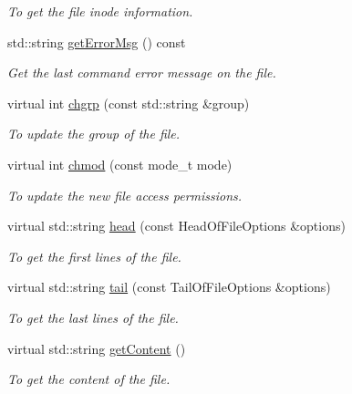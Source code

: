 \begin{DoxyCompactItemize}
\begin{DoxyCompactList}\small\item\em To get the file inode information. \item\end{DoxyCompactList}\item 
std::string \hyperlink{classSSHFile_abe6ff51f2bc2a0da5b504a311ede2648}{getErrorMsg} () const 
\begin{DoxyCompactList}\small\item\em Get the last command error message on the file. \item\end{DoxyCompactList}\item 
virtual int \hyperlink{classSSHFile_aa0b50bce63279fd0c1e14e7b9058b900}{chgrp} (const std::string \&group)
\begin{DoxyCompactList}\small\item\em To update the group of the file. \item\end{DoxyCompactList}\item 
virtual int \hyperlink{classSSHFile_a8a8a8991bac15f105f5bb144c63999b3}{chmod} (const mode\_\-t mode)
\begin{DoxyCompactList}\small\item\em To update the new file access permissions. \item\end{DoxyCompactList}\item 
virtual std::string \hyperlink{classSSHFile_a6dd61931bed51f7a61183ef73beb3d6f}{head} (const HeadOfFileOptions \&options)
\begin{DoxyCompactList}\small\item\em To get the first lines of the file. \item\end{DoxyCompactList}\item 
virtual std::string \hyperlink{classSSHFile_a29bb48719424956f73ddd3eee8dc8090}{tail} (const TailOfFileOptions \&options)
\begin{DoxyCompactList}\small\item\em To get the last lines of the file. \item\end{DoxyCompactList}\item 
virtual std::string \hyperlink{classSSHFile_a1aa5ce33bac38cb9c0370a45b2733e56}{getContent} ()
\begin{DoxyCompactList}\small\item\em To get the content of the file. \item\end{DoxyCompactList}\item 

\end{DoxyCompactItemize}
